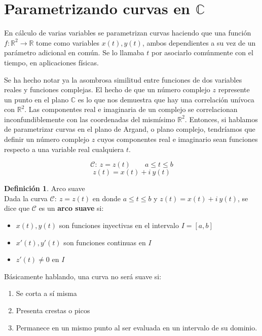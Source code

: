 \documentclass[12pt]{article}
\theoremstyle{definition}
\newtheorem{definition}{Definici\'on}[section]
\theoremstyle{theorem}
\theoremstyle{corolary}
\begin{document}


\section{Parametrizando curvas en $\mathbb{C}$}
En c\'alculo de varias variables se parametrizan curvas haciendo que una funci\'on $f: \mathbb{R}^2 \rightarrow \mathbb{R}$ tome como variables $x(t), y(t)$, ambos dependientes a su vez de un par\'ametro adicional en com\'un. Se lo llamaba $t$ por asociarlo com\'unmente con el tiempo, en aplicaciones f\'isicas.

Se ha hecho notar ya la asombrosa similitud entre funciones de dos variables reales y funciones complejas. El hecho de que un n\'umero complejo $z$ represente un punto en el plano $\mathbb{C}$ es lo que nos demuestra que hay una correlaci\'on un\'ivoca con $\mathbb{R}^2$. Las componentes real e imaginaria de un complejo se correlacionan inconfundiblemente con las coordenadas del mism\'isimo $\mathbb{R}^2$. Entonces, si hablamos de parametrizar curvas en el plano de Argand, o plano complejo, tendr\'iamos que definir un n\'umero complejo $z$ cuyos componentes real e imaginario sean funciones respecto a una variable real cualquiera $t$.

$$\mathcal{C}:\: z = z(t) \qquad a \leq t \leq b$$
$$z(t) = x(t) + i\ y(t)$$

\colorbox{orange!40!white!80}{\parbox{\linewidth}{
 \theoremstyle{definition}
 \begin{definition}{Arco suave}\\
  	Dada la curva $\mathcal{C}:\: z = z(t)$ en donde $a \leq t \leq b$ y $z(t) = x(t) + i\ y(t)$, se dice que $\mathcal{C}$ es un \textbf{arco suave} si:
  	\begin{itemize}
  		\item $x(t), y(t)$ son funciones inyectivas en el intervalo $I=[a,b]$
  		\item $x'(t), y'(t)$ son funciones continuas en $I$
  		\item $z'(t)\neq 0$ en $I$
  	\end{itemize}
 \end{definition}}}
\linebreak
\linebreak

B\'asicamente hablando, una curva no ser\'a suave si:
\begin{enumerate}
	\item Se corta a s\'i misma
	\item Presenta crestas o picos
	\item Permanece en un mismo punto al ser evaluada en un intervalo de su dominio.\\
\end{enumerate}
\end{document}
